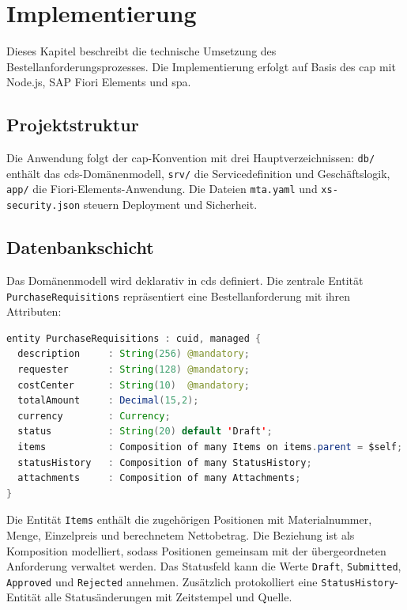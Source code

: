 \section{Implementierung}

Dieses Kapitel beschreibt die technische Umsetzung des Bestellanforderungsprozesses. Die Implementierung erfolgt auf Basis des \gls{cap} mit Node.js, SAP Fiori Elements und \gls{spa}.

\subsection{Projektstruktur}

Die Anwendung folgt der \gls{cap}-Konvention mit drei Hauptverzeichnissen: \texttt{db/} enthält das \gls{cds}-Domänenmodell, \texttt{srv/} die Servicedefinition und Geschäftslogik, \texttt{app/} die Fiori-Elements-Anwendung. Die Dateien \texttt{mta.yaml} und \texttt{xs-security.json} steuern Deployment und Sicherheit.

\subsection{Datenbankschicht}

Das Domänenmodell wird deklarativ in \gls{cds} definiert. Die zentrale Entität \texttt{PurchaseRequisitions} repräsentiert eine Bestellanforderung mit ihren Attributen:

\begin{lstlisting}[language=Java, caption={Auszug aus dem CDS-Domänenmodell}, label={lst:cds-model}]
entity PurchaseRequisitions : cuid, managed {
  description     : String(256) @mandatory;
  requester       : String(128) @mandatory;
  costCenter      : String(10)  @mandatory;
  totalAmount     : Decimal(15,2);
  currency        : Currency;
  status          : String(20) default 'Draft';
  items           : Composition of many Items on items.parent = $self;
  statusHistory   : Composition of many StatusHistory;
  attachments     : Composition of many Attachments;
}
\end{lstlisting}

Die Entität \texttt{Items} enthält die zugehörigen Positionen mit Materialnummer, Menge, Einzelpreis und berechnetem Nettobetrag. Die Beziehung ist als Komposition modelliert, sodass Positionen gemeinsam mit der übergeordneten Anforderung verwaltet werden. Das Statusfeld kann die Werte \texttt{Draft}, \texttt{Submitted}, \texttt{Approved} und \texttt{Rejected} annehmen. Zusätzlich protokolliert eine \texttt{StatusHistory}-Entität alle Statusänderungen mit Zeitstempel und Quelle.

